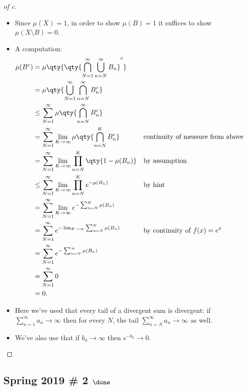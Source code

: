 \begin{solution}
\begin{proof}[of c]
\begin{itemize}
\item
  Since \(\mu(X) = 1\), in order to show \(\mu(B) = 1\) it suffices to
  show \(\mu(X\setminus B) = 0\).
\item
  A computation:
  \begin{align*}
  \mu(B^c) 
  &= \mu\qty{
  \qty{
  \displaystyle\bigcap_{N=1}^\infty \displaystyle\bigcup_{n=N}^\infty B_n
  }^c
  }\\
  &= \mu\qty{
  \displaystyle\bigcup_{N=1}^\infty \displaystyle\bigcap_{n=N}^\infty B_n^c
  } \\
  &\leq \sum_{N=1}^\infty 
  \mu\qty{
  \displaystyle\bigcap_{n=N}^\infty B_n^c
  } \\
  &=
  \sum_{N=1}^\infty \lim_{K\to\infty} \mu\qty{ \displaystyle\bigcap_{n=N}^K B_n^c } && \text{continuity of measure from above} \\
  &=
  \sum_{N=1}^\infty \lim_{K\to\infty}  \prod_{n=N}^K \qty{1 - \mu(B_n)} && \text{by assumption} \\
  &\leq 
  \sum_{N=1}^\infty \lim_{K\to\infty}  \prod_{n=N}^K e^{-\mu(B_n)} && \text{by hint} \\
  &=
  \sum_{N=1}^\infty \lim_{K\to\infty}  e^{-\sum_{n=N}^K \mu(B_n)}  \\
  &=
  \sum_{N=1}^\infty  e^{-\lim_{K\to\infty} \sum_{n=N}^K \mu(B_n)} && \text{by continuity of } f(x) = e^x \\
  &=
  \sum_{N=1}^\infty  e^{-\sum_{n=N}^\infty \mu(B_n)}  \\
  &=
  \sum_{N=1}^\infty 0 \\
  &= 0
  .\end{align*}
\item
  Here we've used that every tail of a divergent sum is divergent: if
  \(\sum_{n=1}^\infty a_n \to \infty\) then for every \(N\), the tail
  \(\sum_{n=N}^\infty a_n \to \infty\) as well.
\item
  We've also use that if \(b_n\to \infty\) then \(e^{-b_n} \to 0\).
\end{itemize}

\end{proof}

\end{solution}

\hypertarget{spring-2019-2-done}{%
\subsection{\texorpdfstring{Spring 2019 \# 2
\(\done\)}{Spring 2019 \# 2 \textbackslash done}}\label{spring-2019-2-done}}

